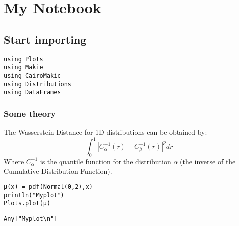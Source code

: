 \newpage

\chapter{My Notebook}

\section{Start importing}

\begin{lstlisting}[language=JuliaLocal, style=julia]
using Plots
using Makie
using CairoMakie
using Distributions
using DataFrames
\end{lstlisting}

\subsection{Some theory}
The Wasserstein Distance for 1D distributions can be obtained by:  $$ \int_0^1 |C_\alpha^{-1}(r) - C_\beta^{-1}(r)|^p dr  $$  Where  $C_\alpha^{-1}$ is the quantile function for the distribution  $\alpha$ (the inverse of the Cumulative Distribution Function). 
\begin{lstlisting}[language=JuliaLocal, style=julia]
μ(x) = pdf(Normal(0,2),x)
println("Myplot")
Plots.plot(μ)
\end{lstlisting}

\begin{verbatim}
Any["Myplot\n"]
\end{verbatim}

